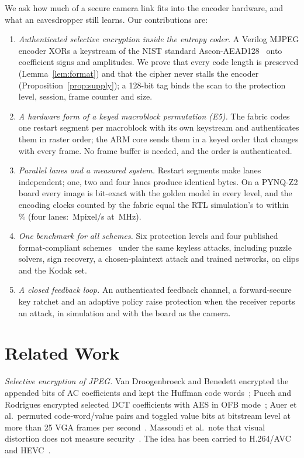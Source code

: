 We ask how much of a secure camera link fits into the encoder hardware, and what an eavesdropper still learns. Our contributions are:
\begin{enumerate}
\item \textit{Authenticated selective encryption inside the entropy coder.} A Verilog MJPEG encoder XORs a keystream of the NIST standard Ascon-AEAD128~\cite{sp800232,ascon} onto coefficient signs and amplitudes. We prove that every code length is preserved (Lemma~\ref{lem:format}) and that the cipher never stalls the encoder (Proposition~\ref{prop:supply}); a 128-bit tag binds the scan to the protection level, session, frame counter and size.
\item \textit{A hardware form of a keyed macroblock permutation (E5).} The fabric codes one restart segment per macroblock with its own keystream and authenticates them in raster order; the ARM core sends them in a keyed order that changes with every frame. No frame buffer is needed, and the order is authenticated.
\item \textit{Parallel lanes and a measured system.} Restart segments make lanes independent; one, two and four lanes produce identical bytes. On a PYNQ-Z2 board every image is bit-exact with the golden model in every level, and the encoding clocks counted by the fabric equal the RTL simulation's to within \BdBusyVsRtlMaxPct\,\% (four lanes: \BdFourBusyMpix\,Mpixel/s at \BdFourMhz\,MHz).
\item \textit{One benchmark for all schemes.} Six protection levels and four published format-compliant schemes~\cite{vandroogenbroeck2002,kishore2015,auer2013,hirose2024} under the same keyless attacks, including puzzle solvers, sign recovery, a chosen-plaintext attack and trained networks, on \NumVideoClips{} clips and the Kodak set.
\item \textit{A closed feedback loop.} An authenticated feedback channel, a forward-secure key ratchet and an adaptive policy raise protection when the receiver reports an attack, in simulation and with the board as the camera.
\end{enumerate}

\section{Related Work}\label{sec:related}
\textit{Selective encryption of JPEG.} Van Droogenbroeck and Benedett encrypted the appended bits of AC coefficients and kept the Huffman code words~\cite{vandroogenbroeck2002}; Puech and Rodrigues encrypted selected DCT coefficients with AES in OFB mode~\cite{puech2005}; Auer et al.\ permuted code-word/value pairs and toggled value bits at bitstream level at more than 25 VGA frames per second~\cite{auer2013}. Massoudi et al.\ note that visual distortion does not measure security~\cite{massoudi2008}. The idea has been carried to H.264/AVC and HEVC~\cite{boyadjis2017}.

